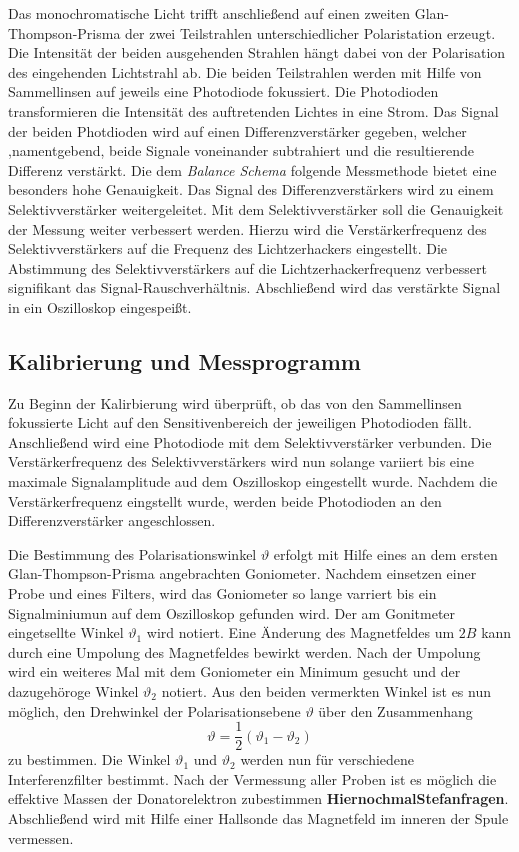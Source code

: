 Das monochromatische Licht trifft anschließend auf einen zweiten Glan-Thompson-Prisma
der zwei Teilstrahlen unterschiedlicher Polaristation erzeugt. Die Intensität
der beiden ausgehenden Strahlen hängt dabei von der Polarisation des eingehenden
Lichtstrahl ab. Die beiden Teilstrahlen werden mit Hilfe von Sammellinsen auf
jeweils eine Photodiode fokussiert. Die Photodioden transformieren die
Intensität des auftretenden Lichtes in eine Strom. Das Signal der beiden
Photdioden wird auf einen Differenzverstärker gegeben, welcher ,namentgebend,
beide Signale voneinander subtrahiert und die resultierende Differenz verstärkt.
Die dem \emph{Balance Schema} folgende Messmethode bietet eine besonders hohe Genauigkeit.
Das Signal des Differenzverstärkers wird zu einem Selektivverstärker weitergeleitet.
Mit dem Selektivverstärker soll die Genauigkeit der Messung weiter verbessert werden.
Hierzu wird die Verstärkerfrequenz des Selektivverstärkers auf die Frequenz des
Lichtzerhackers eingestellt. Die Abstimmung des Selektivverstärkers auf die
Lichtzerhackerfrequenz verbessert signifikant das Signal-Rauschverhältnis.
Abschließend wird das verstärkte Signal in ein Oszilloskop eingespeißt.

\subsection{Kalibrierung und Messprogramm}
Zu Beginn der Kalirbierung wird überprüft, ob das von den Sammellinsen
fokussierte Licht auf den Sensitivenbereich der jeweiligen Photodioden fällt.
Anschließend wird eine Photodiode mit dem Selektivverstärker verbunden.
Die Verstärkerfrequenz des Selektivverstärkers wird nun solange variiert
bis eine maximale Signalamplitude aud dem Oszilloskop eingestellt wurde.
Nachdem die Verstärkerfrequenz eingstellt wurde, werden beide Photodioden
an den Differenzverstärker angeschlossen.

Die Bestimmung des Polarisationswinkel $\vartheta$ erfolgt mit Hilfe eines
an dem ersten Glan-Thompson-Prisma angebrachten Goniometer. Nachdem einsetzen einer
Probe und eines Filters, wird das Goniometer so lange varriert bis ein Signalminiumun
auf dem Oszilloskop gefunden wird. Der am Gonitmeter eingetsellte Winkel $\vartheta_1$ wird
notiert. Eine Änderung des Magnetfeldes um $2B$ kann durch eine Umpolung des
Magnetfeldes bewirkt werden. Nach der Umpolung wird ein weiteres Mal mit dem
Goniometer ein Minimum gesucht und der dazugehöroge Winkel $\vartheta_2$ notiert.
Aus den beiden vermerkten Winkel ist es nun möglich, den Drehwinkel der Polarisationsebene
$\vartheta$ über den Zusammenhang
\begin{equation}
  \label{eq:theta_aus_messung}
  \vartheta = \frac{1}{2}(\vartheta_1 - \vartheta_2)
\end{equation}
zu bestimmen. Die Winkel $\vartheta_1$ und $\vartheta_2$ werden nun für verschiedene
Interferenzfilter bestimmt. Nach der Vermessung aller Proben ist es möglich die
effektive Massen der Donatorelektron zubestimmen \textbf{HiernochmalStefanfragen}.
Abschließend wird mit Hilfe einer Hallsonde das Magnetfeld im inneren der Spule
vermessen.
\FloatBarrier
